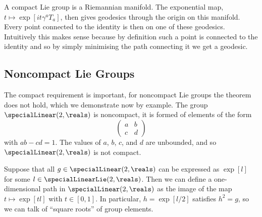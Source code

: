 \documentclass[fleqn]{NotesClass}
\begin{document}
    A compact Lie group is a Riemannian manifold.
    The exponential map, \(t \mapsto \exp[it\gamma^aT_a]\), then gives geodesics through the origin on this manifold.
    Every point connected to the identity is then on one of these geodesics.
    Intuitively this makes sense because by definition such a point is connected to the identity and so by simply minimising the path connecting it we get a geodesic.
    
    \subsection{Noncompact Lie Groups}
    The compact requirement is important, for noncompact Lie groups the theorem does not hold, which we demonstrate now by example.
    The group \(\specialLinear(2, \reals)\) is noncompact, it is formed of elements of the form
    \begin{equation}
        \begin{pmatrix}
            a & b\\ c & d
        \end{pmatrix}
    \end{equation}
    with \(ab - cd = 1\).
    The values of \(a\), \(b\), \(c\), and \(d\) are unbounded, and so \(\specialLinear(2, \reals)\) is not compact.
    
    Suppose that all \(g \in \specialLinear(2, \reals)\) can be expressed as \(\exp[l]\) for some \(l \in \specialLinearLie(2, \reals)\).
    Then we can define a one-dimensional path in \(\specialLinear(2, \reals)\) as the image of the map \(t \mapsto \exp[tl]\) with \(t \in [0, 1]\).
    In particular, \(h = \exp[l/2]\) satisfies \(h^2 = g\), so we can talk of \enquote{square roots} of group elements.
    
\end{document}
